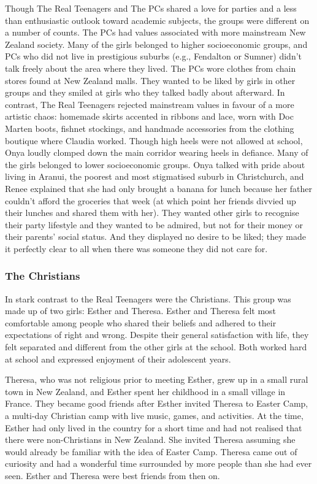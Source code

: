 Though The Real Teenagers and The PCs shared a love for parties and a less than enthusiastic outlook toward academic subjects, the groups were different on a number of counts.  The PCs had values associated with more mainstream New Zealand society.  Many of the girls belonged to higher socioeconomic groups, and PCs who did not live in prestigious suburbs (e.g., Fendalton or Sumner) didn't talk freely about the area where they lived.  The PCs wore clothes from chain stores found at New Zealand malls.  They wanted to be liked by girls in other groups and they smiled at girls who they talked badly about afterward.  In contrast, The Real Teenagers rejected mainstream values in favour of a more artistic chaos: homemade skirts accented in ribbons and lace, worn with Doc Marten boots, fishnet stockings, and handmade accessories from the clothing boutique where Claudia worked.  Though high heels were not allowed at school, Onya loudly clomped down the main corridor wearing heels in defiance.  Many of the girls belonged to lower socioeconomic groups.  Onya talked with pride about living in Aranui, the poorest and most stigmatised suburb in Christchurch, and Renee explained that she had only brought a banana for lunch because her father couldn't afford the groceries that week (at which point her friends divvied up their lunches and shared them with her).  They wanted other girls to recognise their party lifestyle and they wanted to be admired, but not for their money or their parents' social status.  And they displayed no desire to be liked; they made it perfectly clear to all when there was someone they did not care for.

\subsubsection{The Christians}

In stark contrast to the Real Teenagers were the Christians.  This group was made up of two girls: Esther and Theresa.  Esther and Theresa felt most comfortable among people who shared their beliefs and adhered to their expectations of right and wrong.  Despite their general satisfaction with life, they felt separated and different from the other girls at the school.  Both worked hard at school and expressed enjoyment of their adolescent years.
 
Theresa, who was not religious prior to meeting Esther, grew up in a small rural town in New Zealand, and Esther spent her childhood in a small village in France.  They became good friends after Esther invited Theresa to Easter Camp, a multi-day Christian camp with live music, games, and activities.  At the time, Esther had only lived in the country for a short time and had not realised that there were non-Christians in New Zealand.  She invited Theresa assuming she would already be familiar with the idea of Easter Camp.  Theresa came out of curiosity and had a wonderful time surrounded by more people than she had ever seen.  Esther and Theresa were best friends from then on.  

